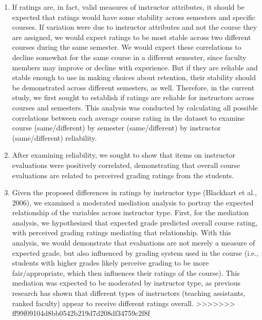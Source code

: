 \documentclass[man]{apa6}
\theoremstyle{definition}
\theoremstyle{definition}
\theoremstyle{definition}
\theoremstyle{remark}
\begin{document}
\begin{enumerate}
\def\labelenumi{\arabic{enumi})}
\item
  If ratings are, in fact, valid measures of instructor attributes, it
  should be expected that ratings would have some stability across
  semesters and specific courses. If variation were due to instructor
  attributes and not the course they are assigned, we would expect
  ratings to be most stable across two different courses during the same
  semester. We would expect these correlations to decline somewhat for
  the same course in a different semester, since faculty members may
  improve or decline with experience. But if they are reliable and
  stable enough to use in making choices about retention, their
  stability should be demonstrated across different semesters, as well.
  Therefore, in the current study, we first sought to establish if
  ratings are reliable for instructors across courses and semesters.
  This analysis was conducted by calculating all possible correlations
  between each average course rating in the dataset to examine course
  (same/different) by semester (same/different) by instructor
  (same/different) reliability.
\item
  After examining reliability, we sought to show that items on
  instructor evaluations were positively correlated, demonstrating that
  overall course evaluations are related to perceived grading ratings
  from the students.
\item
  Given the proposed differences in ratings by instructor type
  (Blackhart et al., 2006), we examined a moderated mediation analysis
  to portray the expected relationship of the variables across
  instructor type. First, for the mediation analysis, we hypothesized
  that expected grade predicted overall course rating, with perceived
  grading ratings mediating that relationship. With this analysis, we
  would demonstrate that evaluations are not merely a measure of
  expected grade, but also influenced by grading system used in the
  course (i.e., students with higher grades likely perceive grading to
  be more fair/appropriate, which then influences their ratings of the
  course). This mediation was expected to be moderated by instructor
  type, as previous research has shown that different types of
  instructors (teaching assistants, ranked faculty) appear to receive
  different ratings overall.
  \textgreater{}\textgreater{}\textgreater{}\textgreater{}\textgreater{}\textgreater{}\textgreater{}
  ff99f09104d8bb0542b219d7d208df34759c2f8f
\end{enumerate}
\end{document}
